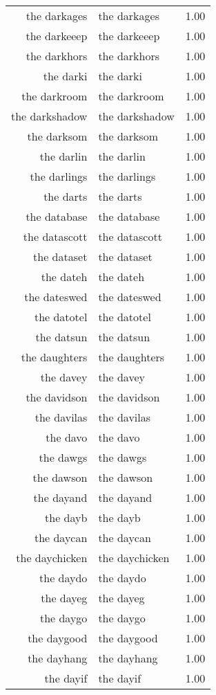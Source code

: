 \begin{table}[ht]
\begin{tabular}{rlr}
  the darkages & the darkages & 1.00 \\ 
  the darkeeep & the darkeeep & 1.00 \\ 
  the darkhors & the darkhors & 1.00 \\ 
  the darki & the darki & 1.00 \\ 
  the darkroom & the darkroom & 1.00 \\ 
  the darkshadow & the darkshadow & 1.00 \\ 
  the darksom & the darksom & 1.00 \\ 
  the darlin & the darlin & 1.00 \\ 
  the darlings & the darlings & 1.00 \\ 
  the darts & the darts & 1.00 \\ 
  the database & the database & 1.00 \\ 
  the datascott & the datascott & 1.00 \\ 
  the dataset & the dataset & 1.00 \\ 
  the dateh & the dateh & 1.00 \\ 
  the dateswed & the dateswed & 1.00 \\ 
  the datotel & the datotel & 1.00 \\ 
  the datsun & the datsun & 1.00 \\ 
  the daughters & the daughters & 1.00 \\ 
  the davey & the davey & 1.00 \\ 
  the davidson & the davidson & 1.00 \\ 
  the davilas & the davilas & 1.00 \\ 
  the davo & the davo & 1.00 \\ 
  the dawgs & the dawgs & 1.00 \\ 
  the dawson & the dawson & 1.00 \\ 
  the dayand & the dayand & 1.00 \\ 
  the dayb & the dayb & 1.00 \\ 
  the daycan & the daycan & 1.00 \\ 
  the daychicken & the daychicken & 1.00 \\ 
  the daydo & the daydo & 1.00 \\ 
  the dayeg & the dayeg & 1.00 \\ 
  the daygo & the daygo & 1.00 \\ 
  the daygood & the daygood & 1.00 \\ 
  the dayhang & the dayhang & 1.00 \\ 
  the dayif & the dayif & 1.00 \\ 

\end{tabular}
\end{table}
